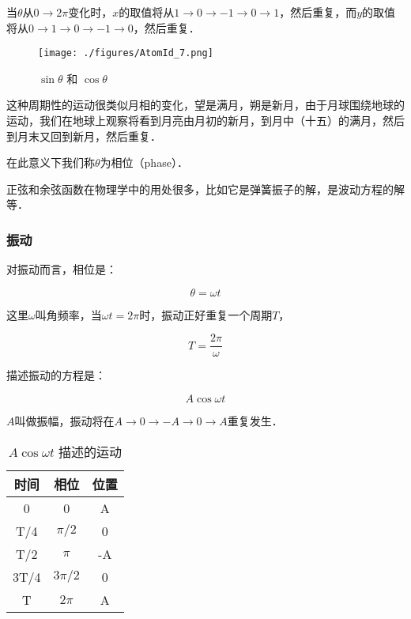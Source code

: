 当$\theta$从$0 \to 2\pi$变化时，$x$的取值将从$1 \to 0 \to -1 \to 0 \to 1$，然后重复，而$y$的取值将从$0 \to 1 \to 0 \to -1 \to 0$，然后重复．

\begin{figure}[ht]
\centering
\texttt{[image: ./figures/AtomId\_7.png]}
\caption{$\sin\theta$ 和 $\cos\theta$} \label{AtomId_fig7}
\end{figure}


这种周期性的运动很类似月相的变化，望是满月，朔是新月，由于月球围绕地球的运动，我们在地球上观察将看到月亮由月初的新月，到月中（十五）的满月，然后到月末又回到新月，然后重复．

在此意义下我们称$\theta$为相位（phase）．

正弦和余弦函数在物理学中的用处很多，比如它是弹簧振子的解，是波动方程的解等．

\subsubsection{振动}

对振动而言，相位是：

\begin{equation}
\theta = \omega t 
\end{equation}

这里$\omega$叫角频率，当$\omega t = 2 \pi$时，振动正好重复一个周期$T$，

\begin{equation}
T = \frac{2 \pi}{\omega}
\end{equation}

描述振动的方程是：

\begin{equation}
A \cos \omega t
\end{equation}

$A$叫做振幅，振动将在$A \to 0 \to -A \to 0 \to A$重复发生．

\begin{table}[ht]
\centering
\caption{$A \cos \omega t$ 描述的运动}\label{AtomId_tab3}
\begin{tabular}{|c|c|c|}
\hline
时间 & 相位 &  位置 \\
\hline
0 & 0 & A \\
\hline
T/4 & $\pi /2 $ & 0 \\
\hline
T/2 & $\pi$ & -A \\
\hline
3T/4 & $3 \pi /2  $ &  0 \\
\hline
T &  $2\pi$  & A \\
\hline
\end{tabular}
\end{table}

